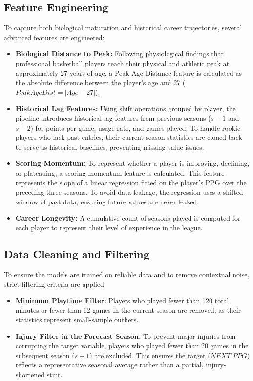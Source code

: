 \documentclass[conference]{IEEEtran}
\begin{document}
\subsection{Feature Engineering}
To capture both biological maturation and historical career trajectories, several advanced features are engineered:
\begin{itemize}
    \item \textbf{Biological Distance to Peak:} Following physiological findings that professional basketball players reach their physical and athletic peak at approximately 27 years of age, a Peak Age Distance feature is calculated as the absolute difference between the player's age and 27 ($PeakAgeDist = |Age - 27|$).
    \item \textbf{Historical Lag Features:} Using shift operations grouped by player, the pipeline introduces historical lag features from previous seasons ($s-1$ and $s-2$) for points per game, usage rate, and games played. To handle rookie players who lack past entries, their current-season statistics are cloned back to serve as historical baselines, preventing missing value issues.
    \item \textbf{Scoring Momentum:} To represent whether a player is improving, declining, or plateauing, a scoring momentum feature is calculated. This feature represents the slope of a linear regression fitted on the player's PPG over the preceding three seasons. To avoid data leakage, the regression uses a shifted window of past data, ensuring future values are never leaked.
    \item \textbf{Career Longevity:} A cumulative count of seasons played is computed for each player to represent their level of experience in the league.
\end{itemize}

\subsection{Data Cleaning and Filtering}
To ensure the models are trained on reliable data and to remove contextual noise, strict filtering criteria are applied:
\begin{itemize}
    \item \textbf{Minimum Playtime Filter:} Players who played fewer than 120 total minutes or fewer than 12 games in the current season are removed, as their statistics represent small-sample outliers.
    \item \textbf{Injury Filter in the Forecast Season:} To prevent major injuries from corrupting the target variable, players who played fewer than 20 games in the subsequent season ($s+1$) are excluded. This ensures the target ($NEXT\_PPG$) reflects a representative seasonal average rather than a partial, injury-shortened stint.
\end{itemize}
\end{document}
